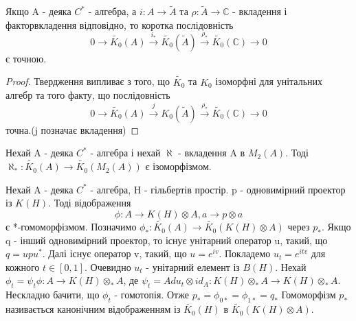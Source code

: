 \begin{remark}
    Якщо A - деяка $C^*$ - алгебра, а $i: A \to \widetilde{A}$ та $\rho: \widetilde{A} \to \mathbb{C}$ - вкладення і
    факторвкладення відповідно, то коротка послідовність
    \begin{equation*}
        0 \to \widetilde{K_0}(A) \xrightarrow{i_*} \widetilde{K_0}(\widetilde{A}) \xrightarrow{\rho_*} \widetilde{K_0}(\mathbb{C}) \to 0
    \end{equation*}
    є точною.

    \begin{proof}
        Твердження випливає з того, що $ \widetilde{K_0} $ та $ K_0 $ ізоморфні для унітальних алгебр та того факту, що
        послідовність
        \begin{equation*}
            0 \to \widetilde{K_0}(A) \xrightarrow{j} K_0(\widetilde{A}) \xrightarrow{\rho_*} \widetilde{K_0}(\mathbb{C}) \to 0
        \end{equation*}
        точна.(j позначає вкладення)
    \end{proof}
\end{remark}

\begin{theorem}
    Нехай A - деяка $C^*$ - алгебра і нехай $\aleph$ - вкладення A в $M_2(A)$.
    Тоді $\aleph_*: \widetilde{K_0}(A) \to \widetilde{K_0}(M_2(A))$ є ізоморфізмом.

\end{theorem}

Нехай A - деяка $C^*$ - алгебра, H - гільбертів простір.
p - одновимірний проектор із $K(H)$.
Тоді відображення
\begin{equation*}
    \phi: A \to K(H) \otimes A, a \to p \otimes a
\end{equation*}
є *-гомоморфізмом.
Позначимо $\phi_*: \widetilde{K_0}(A) \to \widetilde{K_0}(K(H) \otimes A)$ через $p_*$.
Якщо q - інший одновимірний проектор, то існує унітарний оператор u, такий, що $q = u p u^*$.
Далі існує оператор v, такий, що $u = e^{iv}$.
Покладемо $u_t = e^{itv}$ для кожного $t \in [0,1]$.
Очевидно $u_t$ - унітарний елемент із $B(H)$.
Нехай $\phi_t = \psi_t \phi: A \to K(H) \otimes_* A$, де $\psi_t = Ad u_t \otimes id_A: K(H) \otimes_* A \to K(H) \otimes_* A$.
Нескладно бачити, що $\phi_t$ - гомотопія.
Отже $p_* = \phi_{0*} = \phi_{1*} = q_*$
Гомоморфізм $p_*$ називається канонічним відображенням із $\widetilde{K_0}(H)$ в $\widetilde{K_0}(K(H) \otimes A)$.

